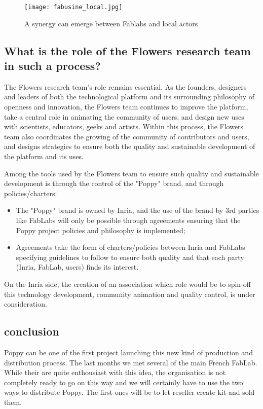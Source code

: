 \begin{figure}[tb]
    \begin{center}
        \texttt{[image: fabusine\_local.jpg]}
    \end{center}
    \caption{A synergy can emerge between Fablabs and local actors}
    \label{fig:local_synergy}
\end{figure}

\subsection{What is the role of the Flowers research team in such a process? } %

The Flowers research team's role remains essential. As the founders, designers and leaders of both the technological platform and its surrounding philosophy of openness and innovation, the Flowers team continues to improve the platform, take a central role in animating the community of users, and design new uses with scientists, educators, geeks and artists. Within this process, the Flowers team also coordinates the growing of the community of contributors and users, and designs strategies to ensure both the quality and sustainable development of the platform and its uses.

Among the tools used by the Flowers team to ensure such quality and sustainable development is through the control of the "Poppy" brand, and through policies/charters:

\begin{itemize}
\item The "Poppy" brand is owned by Inria, and the use of the brand by 3rd parties like FabLabs will only be possible through agreements ensuring that the Poppy project policies and philosophy is implemented;
\item Agreements take the form of charters/policies between Inria and FabLabs specifying guidelines to follow to ensure both quality and that each party (Inria, FabLab, users) finds its interest.
\end{itemize}

On the Inria side, the creation of an association which role would be to spin-off this technology development, community animation and quality control, is under consideration.


\subsection{conclusion} %
Poppy can be one of the first project launching this new kind of production and distribution process. The last months we met several of the main French FabLab. While their are quite enthousiast with this idea, the organisation is not completely ready to go on this way and we will certainly have to use the two ways to distribute Poppy. The first ones will be to let reseller create kit and sold them.







